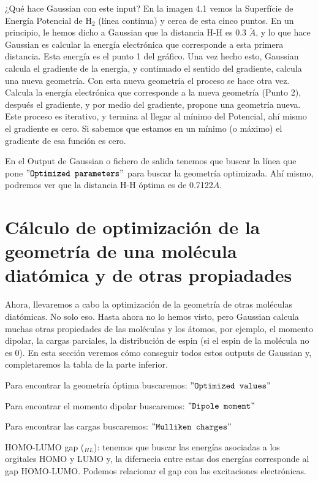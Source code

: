 \documentclass{tufte-book}
\begin{document}
¿Qué hace Gaussian con este input? En la imagen 4.1 
vemos la Superfície de Energía Potencial de H$_2$ (línea continua) y cerca de esta cinco puntos. En un principio, le hemos dicho a Gaussian que la distancia H-H es 0.3 $\ddot{A}$, y lo que hace Gaussian es calcular la energía electrónica que corresponde a esta primera distancia. Esta energía es el punto 1 del gráfico. Una vez hecho esto, Gaussian calcula el gradiente de la energía, y continuado el sentido del gradiente, calcula una nueva geometría. Con esta nueva geometría el proceso se hace otra vez. Calcula la energía electrónica que corresponde a la nueva geometría (Punto 2), después el gradiente, y por medio del gradiente, propone una geometría nueva. Este proceso es iterativo, y termina al llegar al mínimo del Potencial, ahí mismo el gradiente es cero. Si sabemos que estamos en un mínimo (o máximo) el gradiente de esa función es cero.

En el Output de Gaussian o fichero de salida tenemos que buscar la línea que pone $"\texttt{Optimized parameters}"$ para buscar la geometría optimizada. Ahí mismo, podremos ver que la distancia H-H óptima es de 0.7122$\ddot{A}$.

\section{Cálculo de optimización de la geometría de una molécula diatómica y de otras propiadades}

Ahora, llevaremos a cabo la optimización de la geometría de otras moléculas diatómicas. No solo eso. Hasta ahora no lo hemos visto, pero Gaussian calcula muchas otras propiedades de las moléculas y los átomos, por ejemplo, el momento dipolar, la cargas parciales, la distribución de espin (si el espin de la molécula no es 0). En esta sección veremos cómo conseguir todos estos outputs de Gaussian y, completaremos la tabla de la parte inferior. 

Para encontrar la geometría óptima buscaremos: $"\texttt{Optimized values}"$

Para encontrar el momento dipolar buscaremos: $"\texttt{Dipole moment}"$

Para encontrar las cargas buscaremos: $"\texttt{Mulliken charges}"$

HOMO-LUMO gap (\bigtriangleup$_{HL}$): tenemos que buscar las energías asociadas a los orgitales HOMO y LUMO y, la difernecia entre estas dos energías corresponde al gap HOMO-LUMO. Podemos relacionar el gap con las excitaciones electrónicas.
\end{document}
